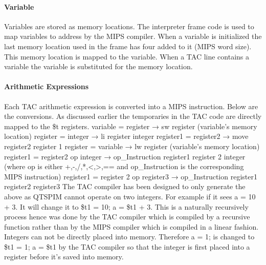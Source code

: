 \documentclass{article}
\begin{document}
	\paragraph{Variable}
	
	Variables are stored as memory locations. The interpreter frame code is used to map variables to address by the MIPS compiler. When a variable is initialized the last memory location used in the frame has four added to it (MIPS word size). This memory location is mapped to the variable. When a TAC line contains a variable the variable is substituted for the memory location. 
	
	\paragraph{Arithmetic Expressions}
	
	Each TAC arithmetic expression is converted into a MIPS instruction. Below are the conversions. As discussed earlier the temporaries in the TAC code are directly mapped to the \$t registers.
	\newline
	variable = register → sw register (variable's memory location) \newline
	\newline
	register = integer → li register integer\newline
	\newline
	register1 = register2 → move register2 register 1\newline
	\newline
	register = variable → lw register (variable's memory location)\newline
	\newline
	register1 = register2 op integer → op\_Instruction register1 register 2 integer \newline
	(where op is either +,-,/,*,<,>,== and op\_Instruction is the corresponding MIPS instruction)\newline
	\newline
	register1 = register 2 op register3 → op\_Instruction register1 register2 register3\newline
	\newline
	The TAC compiler has been designed to only generate the above as QTSPIM cannot operate on two integers. For example if it sees a = 10 + 3. It will change it to \$t1 = 10; a = \$t1 + 3. This is a naturally recursively process hence was done by the TAC compiler which is compiled by a recursive function rather than by the MIPS compiler which is compiled in a linear fashion. Integers can not be directly placed into memory. Therefore a = 1; is changed to \$t1 = 1; a = \$t1 by the TAC compiler so that the integer is first placed into a register before it's saved into memory. 
	
\end{document}
